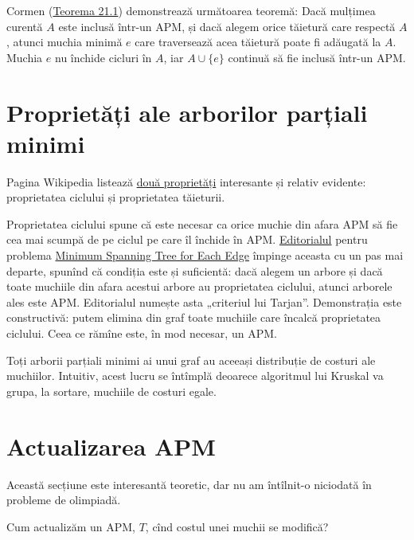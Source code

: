 \documentclass[../main.tex]{subfiles}
\begin{document}
Cormen (\href{https://dl.ebooksworld.ir/books/Introduction.to.Algorithms.4th.Leiserson.Stein.Rivest.Cormen.MIT.Press.9780262046305.EBooksWorld.ir.pdf#page=609}{Teorema 21.1}) demonstrează următoarea teoremă: Dacă mulțimea curentă $A$ este inclusă într-un APM, și dacă alegem orice tăietură care respectă $A$, atunci muchia minimă $e$ care traversează acea tăietură poate fi adăugată la $A$. Muchia $e$ nu închide cicluri în $A$, iar $A \cup \{e\}$ continuă să fie inclusă într-un APM.

\section{Proprietăți ale arborilor parțiali minimi}

Pagina Wikipedia listează \href{https://en.wikipedia.org/wiki/Minimum_spanning_tree#Cycle_property}{două proprietăți} interesante și relativ evidente: proprietatea ciclului și proprietatea tăieturii.

Proprietatea ciclului spune că este necesar ca orice muchie din afara APM să fie cea mai scumpă de pe ciclul pe care îl închide în APM. \href{https://codeforces.com/blog/entry/22187}{Editorialul} pentru problema \hyperref[problem:mst-for-each-edge]{Minimum Spanning Tree for Each Edge} împinge aceasta cu un pas mai departe, spunînd că condiția este și suficientă: dacă alegem un arbore și dacă toate muchiile din afara acestui arbore au proprietatea ciclului, atunci arborele ales este APM. Editorialul numește asta „criteriul lui Tarjan”. Demonstrația este constructivă: putem elimina din graf toate muchiile care încalcă proprietatea ciclului. Ceea ce rămîne este, în mod necesar, un APM.

Toți arborii parțiali minimi ai unui graf au aceeași distribuție de costuri ale muchiilor. Intuitiv, acest lucru se întîmplă deoarece algoritmul lui Kruskal va grupa, la sortare, muchiile de costuri egale.

\section{Actualizarea APM}

Această secțiune este interesantă teoretic, dar nu am întîlnit-o niciodată în probleme de olimpiadă.

Cum actualizăm un APM, $T$, cînd costul unei muchii se modifică?
\end{document}
